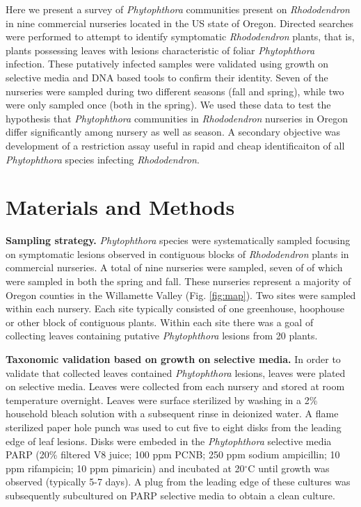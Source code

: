 \documentclass[12pt]{article}
\begin{document}
Here we present a survey of \emph{Phytophthora} communities present on \emph{Rhododendron} in nine commercial nurseries located in the US state of Oregon.  Directed searches were performed to attempt to identify symptomatic \emph{Rhododendron} plants, that is, plants possessing leaves with lesions characteristic of foliar \emph{Phytophthora} infection.  These putatively infected samples were validated using growth on selective media and DNA based tools to confirm their identity.  Seven of the nurseries were sampled during two different seasons (fall and spring), while two were only sampled once (both in the spring).  We used these data to test the hypothesis that \emph{Phytophthora} communities in \emph{Rhododendron} nurseries in Oregon differ significantly among nursery as well as season. A secondary objective was development of a restriction assay useful in rapid and cheap identificaiton of all \emph{Phytophthora} species infecting \emph{Rhododendron}.


\section*{\sffamily\normalsize{Materials and Methods}}

\textbf{Sampling strategy.} \emph{Phytophthora} species were systematically sampled focusing on symptomatic lesions observed in contiguous blocks of \emph{Rhododendron} plants in commercial nurseries.  A total of nine nurseries were sampled, seven of of which were sampled in both  the spring and fall.  These nurseries represent a majority of Oregon counties in the Willamette Valley (Fig. \ref{fig:map}).  Two sites were sampled within each nursery.  Each site typically consisted of one greenhouse, hoophouse or other block of contiguous plants.  Within each site there was a goal of collecting leaves containing putative \emph{Phytophthora} lesions from 20 plants.

\textbf{Taxonomic validation based on growth on selective media.} In order to validate that collected leaves contained \emph{Phytophthora} lesions, leaves were plated on selective media.  Leaves were collected from each nursery and stored at room temperature overnight.  Leaves were surface sterilized by washing in a 2\% household bleach solution with a subsequent rinse in deionized water.  A flame sterilized paper hole punch was used to cut five to eight disks from the leading edge of leaf lesions.  Disks were embeded in the \emph{Phytophthora} selective media PARP (20\% filtered V8 juice; 100 ppm PCNB; 250 ppm sodium ampicillin; 10 ppm rifampicin; 10 ppm pimaricin)\cite{jeffers_martin_1986} and incubated at 20$^\circ$C until growth was observed (typically 5-7 days).  A plug from the leading edge of these cultures was subsequently subcultured on PARP selective media to obtain a clean culture.
\end{document}
